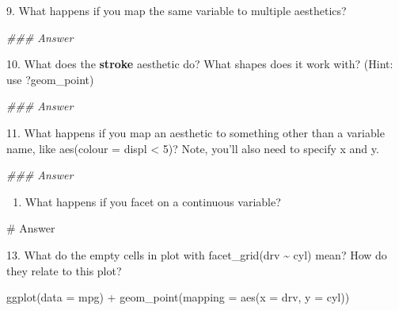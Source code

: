 \documentclass[
  letterpaper,
  DIV=11,
  numbers=noendperiod]{scrreprt}
\newenvironment{Shaded}{\begin{snugshade}}{\end{snugshade}}
\newcommand{\AttributeTok}[1]{\textcolor[rgb]{0.40,0.45,0.13}{#1}}
\newcommand{\CommentTok}[1]{\textcolor[rgb]{0.37,0.37,0.37}{#1}}
\newcommand{\DocumentationTok}[1]{\textcolor[rgb]{0.37,0.37,0.37}{\textit{#1}}}
\newcommand{\FunctionTok}[1]{\textcolor[rgb]{0.28,0.35,0.67}{#1}}
\newcommand{\NormalTok}[1]{\textcolor[rgb]{0.00,0.23,0.31}{#1}}
\newcommand{\SpecialCharTok}[1]{\textcolor[rgb]{0.37,0.37,0.37}{#1}}
\providecommand{\tightlist}{%
  \setlength{\itemsep}{0pt}\setlength{\parskip}{0pt}}\usepackage{longtable,booktabs,array}
\begin{document}
9. What happens if you map the same variable to multiple aesthetics?

\begin{Shaded}
\begin{Highlighting}[]
\DocumentationTok{\#\#\# Answer}
\end{Highlighting}
\end{Shaded}

10. What does the \textbf{stroke} aesthetic do? What shapes does it work
with? (Hint: use ?geom\_point)

\begin{Shaded}
\begin{Highlighting}[]
\DocumentationTok{\#\#\# Answer}
\end{Highlighting}
\end{Shaded}

11. What happens if you map an aesthetic to something other than a
variable name, like aes(colour = displ \textless{} 5)? Note, you'll also
need to specify x and y.

\begin{Shaded}
\begin{Highlighting}[]
\DocumentationTok{\#\#\# Answer}
\end{Highlighting}
\end{Shaded}

\begin{enumerate}
\def\labelenumi{\arabic{enumi}.}
\setcounter{enumi}{11}
\tightlist
\item
  What happens if you facet on a continuous variable?
\end{enumerate}

\begin{Shaded}
\begin{Highlighting}[]
\CommentTok{\# Answer}
\end{Highlighting}
\end{Shaded}

13. What do the empty cells in plot with facet\_grid(drv
\textasciitilde{} cyl) mean? How do they relate to this plot?

\begin{Shaded}
\begin{Highlighting}[]
\FunctionTok{ggplot}\NormalTok{(}\AttributeTok{data =}\NormalTok{ mpg) }\SpecialCharTok{+} 
  \FunctionTok{geom\_point}\NormalTok{(}\AttributeTok{mapping =} \FunctionTok{aes}\NormalTok{(}\AttributeTok{x =}\NormalTok{ drv, }\AttributeTok{y =}\NormalTok{ cyl))}
\end{Highlighting}
\end{Shaded}
\end{document}
